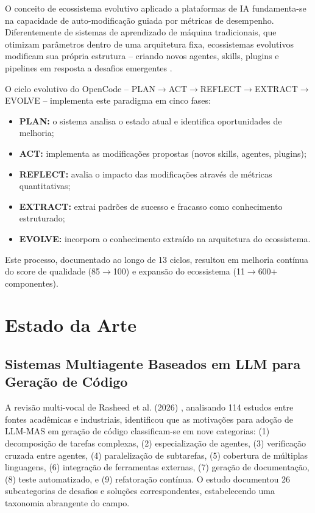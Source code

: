 \documentclass[12pt,a4paper,sumario=tradicional]{abntex2}
\begin{document}
O conceito de ecossistema evolutivo aplicado a plataformas de IA fundamenta-se na capacidade de auto-modificação guiada por métricas de desempenho. Diferentemente de sistemas de aprendizado de máquina tradicionais, que otimizam parâmetros dentro de uma arquitetura fixa, ecossistemas evolutivos modificam sua própria estrutura -- criando novos agentes, skills, plugins e pipelines em resposta a desafios emergentes \cite{kodumagulla2026engineering}.

O ciclo evolutivo do OpenCode -- PLAN$\rightarrow$ACT$\rightarrow$REFLECT$\rightarrow$EXTRACT$\rightarrow$EVOLVE -- implementa este paradigma em cinco fases:
\begin{itemize}
    \item \textbf{PLAN:} o sistema analisa o estado atual e identifica oportunidades de melhoria;
    \item \textbf{ACT:} implementa as modificações propostas (novos skills, agentes, plugins);
    \item \textbf{REFLECT:} avalia o impacto das modificações através de métricas quantitativas;
    \item \textbf{EXTRACT:} extrai padrões de sucesso e fracasso como conhecimento estruturado;
    \item \textbf{EVOLVE:} incorpora o conhecimento extraído na arquitetura do ecossistema.
\end{itemize}

Este processo, documentado ao longo de 13 ciclos, resultou em melhoria contínua do score de qualidade (85$\rightarrow$100) e expansão do ecossistema (11$\rightarrow$600+ componentes).

\chapter{Estado da Arte}

\section{Sistemas Multiagente Baseados em LLM para Geração de Código}

A revisão multi-vocal de Rasheed et al. (2026) \cite{rasheed2026llm}, analisando 114 estudos entre fontes acadêmicas e industriais, identificou que as motivações para adoção de LLM-MAS em geração de código classificam-se em nove categorias: (1) decomposição de tarefas complexas, (2) especialização de agentes, (3) verificação cruzada entre agentes, (4) paralelização de subtarefas, (5) cobertura de múltiplas linguagens, (6) integração de ferramentas externas, (7) geração de documentação, (8) teste automatizado, e (9) refatoração contínua. O estudo documentou 26 subcategorias de desafios e soluções correspondentes, estabelecendo uma taxonomia abrangente do campo.
\end{document}
